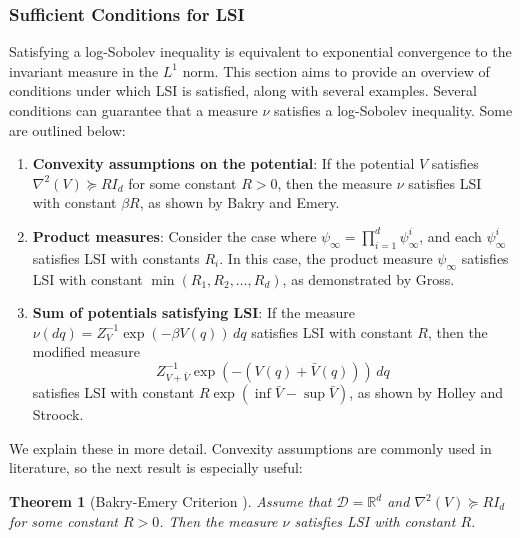 \documentclass[11pt, twoside]{report}
\newtheorem{theorem}{Theorem}[section]
\begin{document}
\subsubsection{Sufficient Conditions for LSI}

Satisfying a log-Sobolev inequality is equivalent to exponential convergence to the invariant measure in the $ L^1 $ norm. This section aims to provide an overview of conditions under which LSI is satisfied, along with several examples. Several conditions can guarantee that a measure $\nu$ satisfies a log-Sobolev inequality. Some are outlined below:

\begin{enumerate}
    \item \textbf{Convexity assumptions on the potential}: 
    If the potential $ V $ satisfies $\nabla^2(V) \succeq R I_d$ for some constant $ R > 0 $, then the measure $ \nu $ satisfies LSI with constant $ \beta R $, as shown by Bakry and Emery\cite{bakryemery}.
    
    \item \textbf{Product measures}: 
    Consider the case where $ \psi_\infty = \prod_{i=1}^d \psi_\infty^i $, and each $ \psi_\infty^i $ satisfies LSI with constants $ R_i $. In this case, the product measure $ \psi_\infty $ satisfies LSI with constant $ \min(R_1, R_2, \dots, R_d) $, as demonstrated by Gross\cite{Gross1975}.
    
    \item \textbf{Sum of potentials satisfying LSI}: 
    If the measure $ \nu(dq) = Z_V^{-1} \exp{(-\beta V(q))} \, dq $ satisfies LSI with constant $ R $, then the modified measure
    \[
    Z_{V + \bar{V}}^{-1} \exp{(-(V(q) + \bar{V}(q)))} \, dq
    \]
    satisfies LSI with constant $ R \exp(\inf \bar{V} - \sup \bar{V}) $, as shown by Holley and Stroock\cite{Holley1987}.
\end{enumerate}
We explain these in more detail. Convexity assumptions are commonly used in literature, so the next result is especially useful: 
\begin{theorem}[Bakry-Emery Criterion \cite{bakryemery}]
    Assume that $\mathcal{D} = \mathbb{R}^d$ and $\nabla^2(V) \succeq R I_d$ for some constant $R > 0$. Then the measure $\nu$ satisfies LSI with constant  $R$.
\end{theorem}
\end{document}
